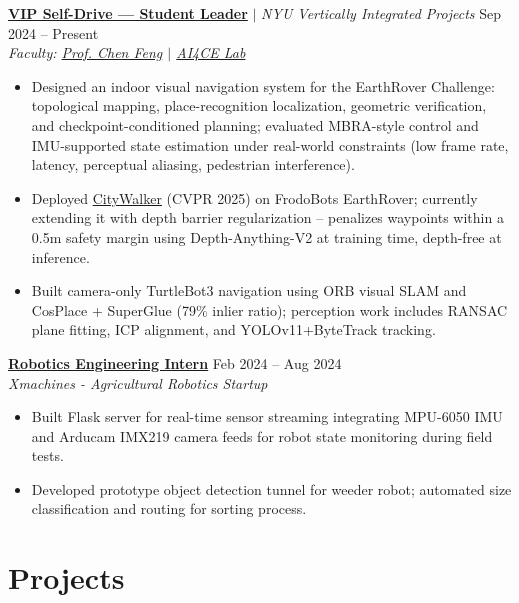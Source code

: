 \documentclass[10pt,letterpaper]{article}
\begin{document}
\href{https://engineering.nyu.edu/research/student-research/vertically-integrated-projects/vip-teams/nyu-self-drive}{\textbf{VIP Self-Drive — Student Leader}} $|$ \textit{NYU Vertically Integrated Projects} \hfill Sep 2024 -- Present \\
\textit{Faculty: \href{https://scholar.google.com/citations?user=YeG8ZM0AAAAJ}{Prof. Chen Feng} $|$ \href{https://ai4ce.github.io/}{AI4CE Lab}}
\begin{itemize}
    \item Designed an indoor visual navigation system for the EarthRover Challenge: topological mapping, place-recognition localization, geometric verification, and checkpoint-conditioned planning; evaluated MBRA-style control and IMU-supported state estimation under real-world constraints (low frame rate, latency, perceptual aliasing, pedestrian interference).
    \item Deployed \href{https://ai4ce.github.io/CityWalker/}{CityWalker} (CVPR 2025) on FrodoBots EarthRover; currently extending it with depth barrier regularization -- penalizes waypoints within a 0.5m safety margin using Depth-Anything-V2 at training time, depth-free at inference.
    \item Built camera-only TurtleBot3 navigation using ORB visual SLAM and CosPlace + SuperGlue (79\% inlier ratio); perception work includes RANSAC plane fitting, ICP alignment, and YOLOv11+ByteTrack tracking.
\end{itemize}

\href{https://www.xmachines.ai/}{\textbf{Robotics Engineering Intern}} \hfill Feb 2024 -- Aug 2024 \\
\textit{Xmachines - Agricultural Robotics Startup}
\begin{itemize}
    \item Built Flask server for real-time sensor streaming integrating MPU-6050 IMU and Arducam IMX219 camera feeds for robot state monitoring during field tests.
    \item Developed prototype object detection tunnel for weeder robot; automated size classification and routing for sorting process.
\end{itemize}
\vspace{1pt}

\section{Projects}
\end{document}
